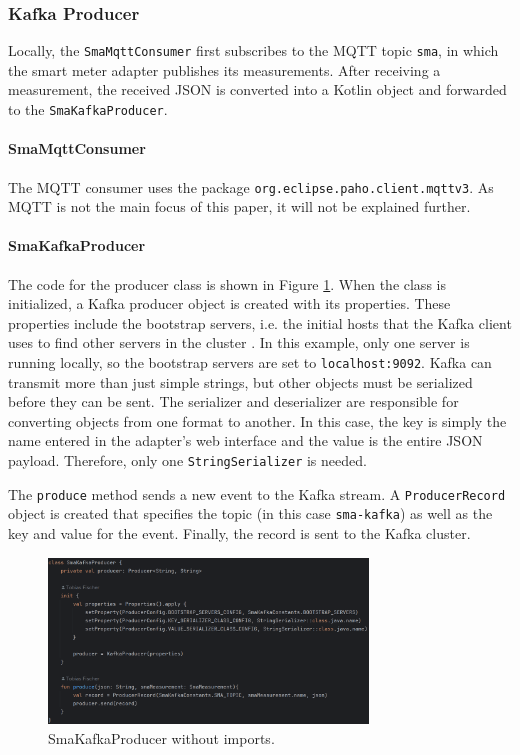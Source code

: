 \subsubsection{Kafka Producer}

Locally, the \lstinline{SmaMqttConsumer} first subscribes to the MQTT topic \lstinline{sma}, in which the smart meter adapter publishes its measurements. After receiving a measurement, the received JSON is converted into a Kotlin object and forwarded to the \lstinline{SmaKafkaProducer}.

\paragraph{SmaMqttConsumer}

The MQTT consumer uses the package \lstinline{org.eclipse.paho.client.mqttv3}. As MQTT is not the main focus of this paper, it will not be explained further.

\paragraph{SmaKafkaProducer}

The code for the producer class is shown in Figure \ref{fig:producer}. When the class is initialized, a Kafka producer object is created with its properties. These properties include the bootstrap servers, i.e. the initial hosts that the Kafka client uses to find other servers in the cluster \cite{kafkaDoc}. In this example, only one server is running locally, so the bootstrap servers are set to \lstinline{localhost:9092}. Kafka can transmit more than just simple strings, but other objects must be serialized before they can be sent. The serializer and deserializer are responsible for converting objects from one format to another. In this case, the key is simply the name entered in the adapter's web interface and the value is the entire JSON payload. Therefore, only one \lstinline{StringSerializer} is needed.

The \lstinline{produce} method sends a new event to the Kafka stream. A \lstinline{ProducerRecord} object is created that specifies the topic (in this case \lstinline{sma-kafka}) as well as the key and value for the event. Finally, the record is sent to the Kafka cluster.

\begin{figure}[ht]
    \centering
    \includegraphics[width=8.5cm]{images/producer.png}
    \caption{SmaKafkaProducer without imports.}
    \label{fig:producer}
\end{figure}

